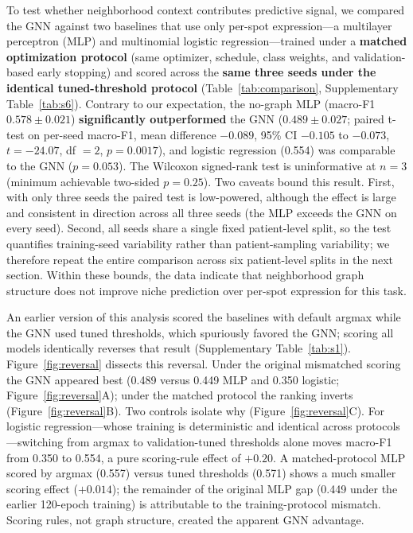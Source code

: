 \documentclass[11pt,letterpaper]{article}
\begin{document}
To test whether neighborhood context contributes predictive signal, we compared the GNN against two baselines that use only per-spot expression---a multilayer perceptron (MLP) and multinomial logistic regression---trained under a \textbf{matched optimization protocol} (same optimizer, schedule, class weights, and validation-based early stopping) and scored across the \textbf{same three seeds under the identical tuned-threshold protocol} (Table~\ref{tab:comparison}, Supplementary Table~\ref{tab:s6}). Contrary to our expectation, the no-graph MLP (macro-F1 $0.578 \pm 0.021$) \textbf{significantly outperformed} the GNN ($0.489 \pm 0.027$; paired t-test on per-seed macro-F1, mean difference $-0.089$, 95\% CI $-0.105$ to $-0.073$, $t=-24.07$, df $=2$, $p=0.0017$), and logistic regression (0.554) was comparable to the GNN ($p=0.053$). The Wilcoxon signed-rank test is uninformative at $n=3$ (minimum achievable two-sided $p=0.25$). Two caveats bound this result. First, with only three seeds the paired test is low-powered, although the effect is large and consistent in direction across all three seeds (the MLP exceeds the GNN on every seed). Second, all seeds share a single fixed patient-level split, so the test quantifies training-seed variability rather than patient-sampling variability; we therefore repeat the entire comparison across six patient-level splits in the next section. Within these bounds, the data indicate that neighborhood graph structure does not improve niche prediction over per-spot expression for this task. 

An earlier version of this analysis scored the baselines with default argmax while the GNN used tuned thresholds, which spuriously favored the GNN; scoring all models identically reverses that result (Supplementary Table~\ref{tab:s1}). Figure~\ref{fig:reversal} dissects this reversal. Under the original mismatched scoring the GNN appeared best (0.489 versus 0.449 MLP and 0.350 logistic; Figure~\ref{fig:reversal}A); under the matched protocol the ranking inverts (Figure~\ref{fig:reversal}B). Two controls isolate why (Figure~\ref{fig:reversal}C). For logistic regression---whose training is deterministic and identical across protocols---switching from argmax to validation-tuned thresholds alone moves macro-F1 from 0.350 to 0.554, a pure scoring-rule effect of $+0.20$. A matched-protocol MLP scored by argmax (0.557) versus tuned thresholds (0.571) shows a much smaller scoring effect ($+0.014$); the remainder of the original MLP gap (0.449 under the earlier 120-epoch training) is attributable to the training-protocol mismatch. Scoring rules, not graph structure, created the apparent GNN advantage.
\end{document}
